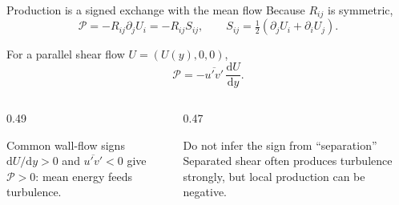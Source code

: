 \documentclass[aspectratio=169,11pt]{beamer}
\newcommand{\mean}[1]{\overline{#1}}
\begin{document}
\begin{frame}{Production is a signed exchange with the mean flow}
Because $R_{ij}$ is symmetric,
\[
  \mathcal P=-R_{ij}\partial_jU_i=-R_{ij}S_{ij},
  \qquad
  S_{ij}=\tfrac12(\partial_jU_i+\partial_iU_j).
\]

For a parallel shear flow $U=(U(y),0,0)$,
\[
  \mathcal P=-\mean{u'v'}\,\frac{\mathrm dU}{\mathrm dy}.
\]

\begin{columns}[T,onlytextwidth]
\begin{column}{0.49\textwidth}
\begin{block}{Common wall-flow signs}
$\mathrm dU/\mathrm dy>0$ and $\mean{u'v'}<0$ give $\mathcal P>0$: mean energy feeds turbulence.
\end{block}
\end{column}
\begin{column}{0.47\textwidth}
\begin{alertblock}{Do not infer the sign from ``separation''}
Separated shear often produces turbulence strongly, but local production can be negative.
\end{alertblock}
\end{column}
\end{columns}
\end{frame}
\end{document}
